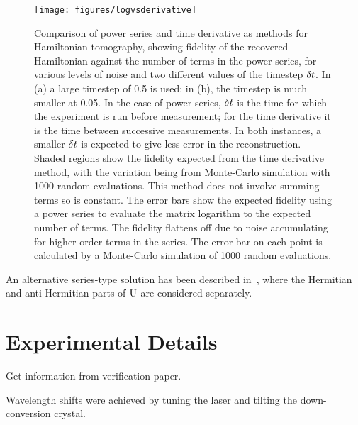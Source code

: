\begin{figure}[h]
  \texttt{[image: figures/logvsderivative]}
  \caption[Comparison of power series and time derivative methods for
  Hamiltonian recovery]
  {Comparison of power series and time derivative as methods for Hamiltonian
  tomography, showing fidelity of the recovered Hamiltonian against the number
  of terms in the power series, for various levels of noise and two different
  values of the timestep \(\delta t\). In (a) a large timestep of 0.5 is used; in
  (b), the timestep is much smaller at 0.05. In the case of power series,
  \(\delta t\) is the time for which the experiment is run before measurement; for
  the time derivative it is the time between successive measurements. In both
  instances, a smaller \(\delta t\) is expected to give less error in the
  reconstruction. Shaded regions show
  the fidelity expected from the time derivative method, with the variation
  being from Monte-Carlo simulation with 1000 random evaluations. This method
  does not involve summing terms so is constant. The error bars show the
  expected fidelity using a power series to evaluate the matrix logarithm to the
  expected number of terms. The fidelity flattens off due to noise accumulating
  for higher order terms in the series. The error bar on each point is
  calculated by a Monte-Carlo simulation of 1000 random evaluations.}
  \label{fig:logvsderivative}
\end{figure}

An alternative series-type solution has been described in~\cite{hamiltomo-ulm},
where the Hermitian and anti-Hermitian parts of \(\mathrm{U}\) are considered
separately.

\section{Experimental Details}
\label{sec:HamiltomoExperiment}
Get information from verification paper.

Wavelength shifts were achieved by tuning the laser and tilting the
down-conversion crystal.



